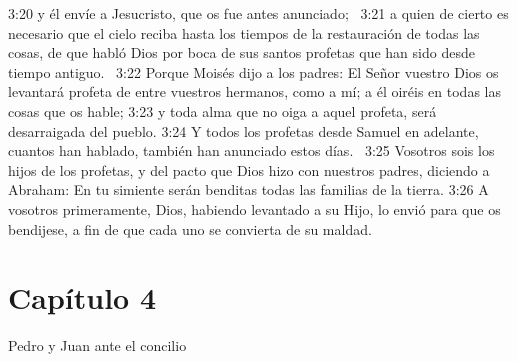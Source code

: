 3:20 y él envíe a Jesucristo, que os fue antes anunciado;  
3:21 a quien de cierto es necesario que el cielo reciba hasta los tiempos de la restauración de todas las cosas, de que habló Dios por boca de sus santos profetas que han sido desde tiempo antiguo.  
3:22 Porque Moisés dijo a los padres: El Señor vuestro Dios os levantará profeta de entre vuestros hermanos, como a mí; a él oiréis en todas las cosas que os hable; 
3:23 y toda alma que no oiga a aquel profeta, será desarraigada del pueblo. 
3:24 Y todos los profetas desde Samuel en adelante, cuantos han hablado, también han anunciado estos días.  
3:25 Vosotros sois los hijos de los profetas, y del pacto que Dios hizo con nuestros padres, diciendo a Abraham: En tu simiente serán benditas todas las familias de la tierra. 
3:26 A vosotros primeramente, Dios, habiendo levantado a su Hijo, lo envió para que os bendijese, a fin de que cada uno se convierta de su maldad.  
\section*{Capítulo 4 }
Pedro y Juan ante el concilio  


